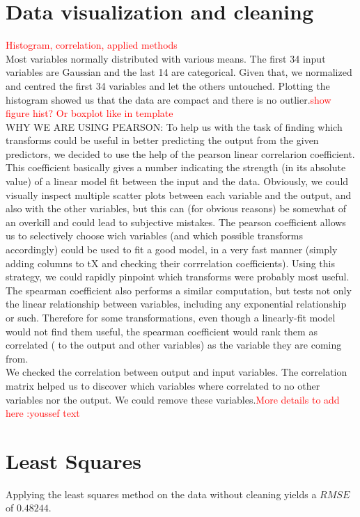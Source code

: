 \documentclass{article} %
\begin{document}
\section{Data visualization and cleaning}
\textcolor{red}{Histogram, correlation, applied methods}\\
Most variables normally distributed with various means. The first 34 input variables are Gaussian and the last 14 are categorical. Given that, we normalized and centred the first 34 variables and let the others untouched. Plotting the histogram showed us that the data are compact and there is no outlier.\textcolor{red}{show figure hist? Or boxplot like in template}\\
WHY WE ARE USING PEARSON:
To help us with the task of finding which transforms could be useful in better predicting the output from the given predictors, we decided to use the help of the pearson linear correlarion coefficient. This coefficient basically gives a number indicating the strength (in its absolute value) of a linear model fit between the input and the data. Obviously, we could visually inspect multiple scatter plots between each variable and the output, and also with the other variables, but this can (for obvious reasons) be somewhat of an overkill and could lead to subjective mistakes. The pearson coefficient allows us to selectively choose wich variables (and which possible transforms accordingly) could be used to fit a good model, in a very fast manner (simply adding columns to tX and checking their corrrelation coefficients). Using this strategy, we could rapidly pinpoint which transforms were probably most useful. The spearman coefficient also performs a similar computation, but tests not only the linear relationship between variables, including any exponential relationship or such. Therefore for some transformations, even though a linearly-fit model would not find them useful, the spearman coefficient would rank them as correlated ( to the output and other variables) as the variable they are coming from.\\

We checked the correlation between output and input variables. The correlation matrix helped us to discover which variables where correlated to no other variables nor the output. We could remove these variables.\textcolor{red}{More details to add here :youssef text}
\section{Least Squares}
Applying the least squares method on the data without cleaning yields a $RMSE$ of $0.48244$.
\end{document}

